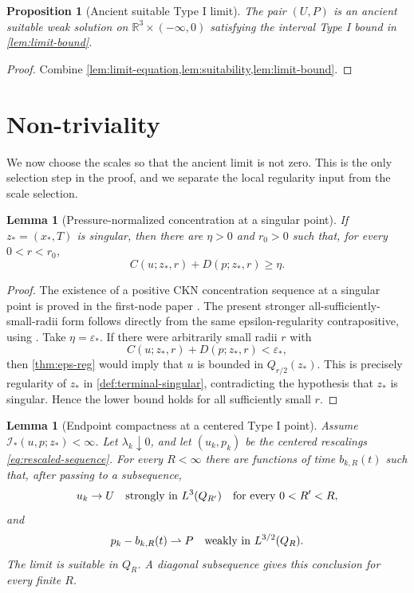 \documentclass[11pt]{amsart}
\theoremstyle{plain}
\newtheorem{proposition}[theorem]{Proposition}
\newtheorem{lemma}[theorem]{Lemma}
\theoremstyle{definition}
\theoremstyle{remark}
\numberwithin{equation}{section}
\newcommand{\R}{\mathbb R}
\newcommand{\eps}{\varepsilon}
\newcommand{\calI}{\mathcal I}
\begin{document}
\begin{proposition}[Ancient suitable Type I limit]\label{prop:ancient-limit}
The pair \((U,P)\) is an ancient suitable weak solution on
\(\R^3\times(-\infty,0)\) satisfying the interval Type I bound in
\cref{lem:limit-bound}.
\end{proposition}

\begin{proof}
Combine \cref{lem:limit-equation,lem:suitability,lem:limit-bound}.
\end{proof}

\section{Non-triviality}\label{sec:nontrivial}

We now choose the scales so that the ancient limit is not zero.  This is the
only selection step in the proof, and we separate the local regularity input
from the scale selection.

\begin{lemma}[Pressure-normalized concentration at a singular point]
\label{lem:singular-concentration}
If \(z_*=(x_*,T)\) is singular, then there are \(\eta>0\) and \(r_0>0\) such
that, for every \(0<r<r_0\),
\begin{equation}\label{eq:positive-concentration-sequence}
   C(u;z_*,r)+D(p;z_*,r)\ge \eta .
\end{equation}
\end{lemma}

\begin{proof}
The existence of a positive CKN concentration sequence at a singular point is
proved in the first-node paper
\cite[Theorem \texttt{thm:singular-positive}]
{Paper0LocalConcentration}.  The present stronger
all-sufficiently-small-radii form follows directly from the same
epsilon-regularity contrapositive, using
\cite[Theorem \texttt{thm:ckn}]{Paper0LocalConcentration}.  Take
\(\eta=\eps_*\).  If there were arbitrarily small radii \(r\) with
\[
   C(u;z_*,r)+D(p;z_*,r)<\eps_*,
\]
then \cref{thm:eps-reg} would imply that \(u\) is bounded in
\(Q_{r/2}(z_*)\).  This is precisely regularity of \(z_*\) in
\cref{def:terminal-singular}, contradicting the hypothesis that \(z_*\) is
singular.  Hence the lower bound holds for all sufficiently small \(r\).
\end{proof}

\begin{lemma}[Endpoint compactness at a centered Type I point]
\label{lem:endpoint-compactness}
Assume \(\calI_*(u,p;z_*)<\infty\).  Let \(\lambda_k\downarrow0\), and let
\((u_k,p_k)\) be the centered rescalings \eqref{eq:rescaled-sequence}.  For
every \(R<\infty\) there are functions of time \(b_{k,R}(t)\) such that,
after passing to a subsequence,
\[
   u_k\to U
   \quad\hbox{strongly in }L^3(Q_{R'})
   \quad\hbox{for every }0<R'<R,
 \]
and
\[
   p_k-b_{k,R}(t)\rightharpoonup P
   \quad\hbox{weakly in }L^{3/2}(Q_R).
 \]
The limit is suitable in \(Q_R\).  A diagonal subsequence gives this conclusion
for every finite \(R\).
\end{lemma}
\end{document}
